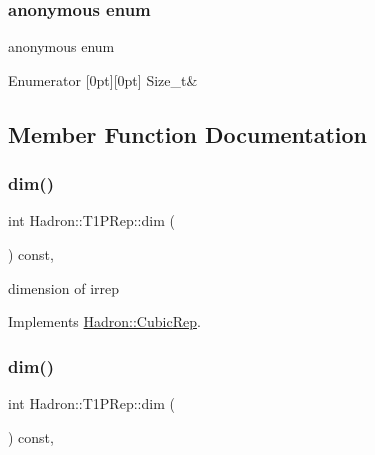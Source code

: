 \subsubsection{\texorpdfstring{anonymous enum}{anonymous enum}}
{\footnotesize\ttfamily anonymous enum}

\begin{DoxyEnumFields}{Enumerator}
[0pt][0pt]{}\mbox{\label{structHadron_1_1T1PRep_a48ed3c45634568c52efa79156ec26262a6a22073dff755f03a0da1a8ad313b559}} 
Size\+\_\+t&\\
\hline

\end{DoxyEnumFields}


\subsection{Member Function Documentation}
\mbox{\label{structHadron_1_1T1PRep_a9ebdff20792657655e3b0fd4ad1eacfc}} 
\subsubsection{\texorpdfstring{dim()}{dim()}\hspace{0.1cm}{\footnotesize\ttfamily [1/2]}}
{\footnotesize\ttfamily int Hadron\+::\+T1\+P\+Rep\+::dim (\begin{DoxyParamCaption}{ }\end{DoxyParamCaption}) const\hspace{0.3cm}{\ttfamily [inline]}, {\ttfamily [virtual]}}

dimension of irrep 

Implements \mbox{\hyperlink{structHadron_1_1CubicRep_ac178d14064f037a66af4b9fb4b312d51}{Hadron\+::\+Cubic\+Rep}}.

\mbox{\label{structHadron_1_1T1PRep_a9ebdff20792657655e3b0fd4ad1eacfc}} 
\subsubsection{\texorpdfstring{dim()}{dim()}\hspace{0.1cm}{\footnotesize\ttfamily [2/2]}}
{\footnotesize\ttfamily int Hadron\+::\+T1\+P\+Rep\+::dim (\begin{DoxyParamCaption}{ }\end{DoxyParamCaption}) const\hspace{0.3cm}{\ttfamily [inline]}, {\ttfamily [virtual]}}

